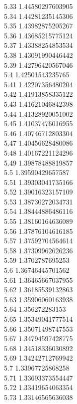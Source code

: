 {5.33	1.44580297603905\\
5.34	1.44281235145306\\
5.35	1.43982875205267\\
5.36	1.43685215775124\\
5.37	1.43388254853534\\
5.38	1.43091990446442\\
5.39	1.42796420567046\\
5.4	1.42501543235765\\
5.41	1.42207356480204\\
5.42	1.41913858335122\\
5.43	1.41621046842398\\
5.44	1.41328920051002\\
5.45	1.41037476016955\\
5.46	1.40746712803304\\
5.47	1.40456628480086\\
5.48	1.40167221124296\\
5.49	1.39878488819857\\
5.5	1.39590429657587\\
5.51	1.39303041735166\\
5.52	1.39016323157109\\
5.53	1.38730272034731\\
5.54	1.38444886486116\\
5.55	1.38160164636089\\
5.56	1.37876104616185\\
5.57	1.37592704564614\\
5.58	1.37309962626236\\
5.59	1.3702787695253\\
5.6	1.36746445701562\\
5.61	1.36465667037955\\
5.62	1.36185539132863\\
5.63	1.35906060163938\\
5.64	1.356272283153\\
5.65	1.35349041777514\\
5.66	1.35071498747553\\
5.67	1.34794597428775\\
5.68	1.34518336030892\\
5.69	1.34242712769942\\
5.7	1.33967725868258\\
5.71	1.33693373554447\\
5.72	1.33419654063354\\
5.73	1.33146565636038\\
}
